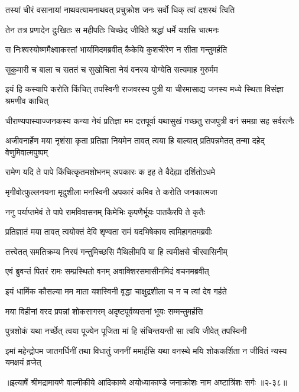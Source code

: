 
\twolineshloka
{तस्यां चीरं वसानायां नाथवत्यामनाथवत्}
{प्रचुक्रोश जनः सर्वो धिक् त्वां दशरथं त्विति} %

\twolineshloka
{तेन तत्र प्रणादेन दुःखितः स महीपतिः}
{चिच्छेद जीविते श्रद्धां धर्मे यशसि चात्मनः} %

\twolineshloka
{स निःश्वस्योष्णमैक्ष्वाकस्तां भार्यामिदमब्रवीत्}
{कैकेयि कुशचीरेण न सीता गन्तुमर्हति} %

\twolineshloka
{सुकुमारी च बाला च सततं च सुखोचिता}
{नेयं वनस्य योग्येति सत्यमाह गुरुर्मम} %

\twolineshloka
{इयं हि कस्यापि करोति किंचित् तपस्विनी राजवरस्य पुत्री}
{या चीरमासाद्य जनस्य मध्ये स्थिता विसंज्ञा श्रमणीव काचित्} %

\twolineshloka
{चीराण्यपास्याज्जनकस्य कन्या नेयं प्रतिज्ञा मम दत्तपूर्वा}
{यथासुखं गच्छतु राजपुत्री वनं समग्रा सह सर्वरत्नैः} %

\twolineshloka
{अजीवनार्हेण मया नृशंसा कृता प्रतिज्ञा नियमेन तावत्}
{त्वया हि बाल्यात् प्रतिपन्नमेतत् तन्मा दहेद् वेणुमिवात्मपुष्पम्} %

\twolineshloka
{रामेण यदि ते पापे किंचित्कृतमशोभनम्}
{अपकारः क इह ते वैदेह्या दर्शितोऽधमे} %

\twolineshloka
{मृगीवोत्फुल्लनयना मृदुशीला मनस्विनी}
{अपकारं कमिव ते करोति जनकात्मजा} %

\twolineshloka
{ननु पर्याप्तमेवं ते पापे रामविवासनम्}
{किमेभिः कृपणैर्भूयः पातकैरपि ते कृतैः} %

\twolineshloka
{प्रतिज्ञातं मया तावत् त्वयोक्तं देवि शृण्वता}
{रामं यदभिषेकाय त्वमिहागतमब्रवीः} %

\twolineshloka
{तत्त्वेतत् समतिक्रम्य निरयं गन्तुमिच्छसि}
{मैथिलीमपि या हि त्वमीक्षसे चीरवासिनीम्} %

\twolineshloka
{एवं ब्रुवन्तं पितरं रामः सम्प्रस्थितो वनम्}
{अवाक्शिरसमासीनमिदं वचनमब्रवीत्} %

\twolineshloka
{इयं धार्मिक कौसल्या मम माता यशस्विनी}
{वृद्धा चाक्षुद्रशीला च न च त्वां देव गर्हते} %

\twolineshloka
{मया विहीनां वरद प्रपन्नां शोकसागरम्}
{अदृष्टपूर्वव्यसनां भूयः सम्मन्तुमर्हसि} %

\twolineshloka
{पुत्रशोकं यथा नर्च्छेत् त्वया पूज्येन पूजिता}
{मां हि संचिन्तयन्ती सा त्वयि जीवेत् तपस्विनी} %

\twolineshloka
{इमां महेन्द्रोपम जातगर्धिनीं तथा विधातुं जननीं ममार्हसि}
{यथा वनस्थे मयि शोककर्शिता न जीवितं न्यस्य यमक्षयं व्रजेत्} %


॥इत्यार्षे श्रीमद्रामायणे वाल्मीकीये आदिकाव्ये अयोध्याकाण्डे जनाक्रोशः नाम अष्टात्रिंशः सर्गः ॥२-३८॥
